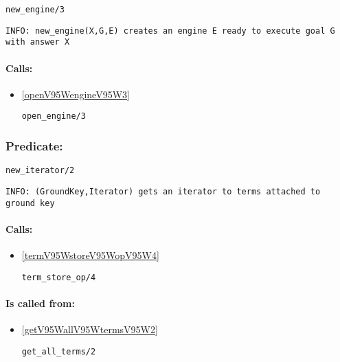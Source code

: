 \begin{verbatim}
new_engine/3
\end{verbatim}

{\small \begin{verbatim}
INFO: new_engine(X,G,E) creates an engine E ready to execute goal G with answer X

\end{verbatim}}
\paragraph{Calls:} 
\begin{itemize}
\item \ref{openV95WengineV95W3} 
\begin{verbatim}
open_engine/3
\end{verbatim}

\end{itemize}

\subsubsection{Predicate:} \label{newV95WiteratorV95W2}

\begin{verbatim}
new_iterator/2
\end{verbatim}

{\small \begin{verbatim}
INFO: (GroundKey,Iterator) gets an iterator to terms attached to ground key

\end{verbatim}}
\paragraph{Calls:} 
\begin{itemize}
\item \ref{termV95WstoreV95WopV95W4} 
\begin{verbatim}
term_store_op/4
\end{verbatim}

\end{itemize}
\paragraph{Is called from:} 
\begin{itemize}
\item \ref{getV95WallV95WtermsV95W2} 
\begin{verbatim}
get_all_terms/2
\end{verbatim}

\end{itemize}


